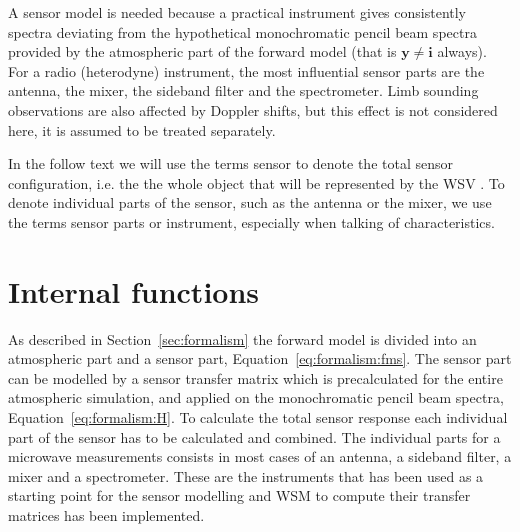 %
%

A sensor model is needed because a practical instrument gives
consistently spectra deviating from the hypothetical monochromatic
pencil beam spectra provided by the atmospheric part of the forward
model (that is $\mathbf{y} \neq \mathbf{i}$ always). For a radio (heterodyne)
instrument, the most influential sensor parts are the antenna, the
mixer, the sideband filter and the spectrometer. Limb sounding
observations are also affected by Doppler shifts, but this effect is
not considered here, it is assumed to be treated separately.

In the follow text we will use the terms sensor to denote the total
sensor configuration, i.e. the the whole object that will be
represented by the WSV . To denote 
individual parts of the sensor, such as the antenna or the mixer, we
use the terms sensor parts or instrument, especially when talking
of characteristics.

\section{Internal functions}
As described in Section~\ref{sec:formalism} the forward model is divided into an atmospheric
part and a sensor part, Equation~\ref{eq:formalism:fms}. The sensor part can be modelled by a
sensor transfer matrix which is precalculated for the entire atmospheric simulation, and applied on the monochromatic pencil beam spectra, Equation~\ref{eq:formalism:H}. To calculate the total sensor response each individual part of the sensor has to be calculated and combined.
The individual parts for a microwave measurements consists in most cases of an antenna, a sideband filter, a mixer and a spectrometer. These are the instruments that has been used as a starting point for the sensor modelling and WSM to compute their transfer matrices has been implemented.
 
